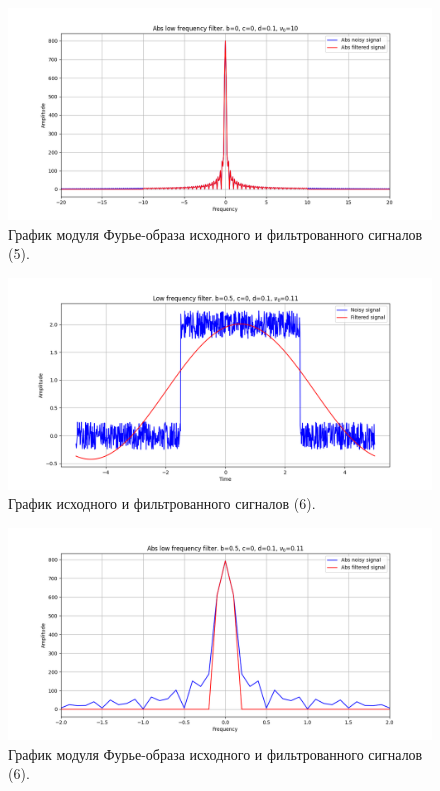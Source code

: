 \documentclass[a4paper, 12pt]{article}
\begin{document}
    \begin{figure}[!htb]
        \centering
        \includegraphics[scale=0.48]{4_abs_u_U_nohigh.png}
        \captionsetup{skip=0pt}
        \caption{График модуля Фурье-образа исходного и фильтрованного сигналов (5).}
        \label{fig:fig10}
    \end{figure}
    \begin{figure}[!htb]
        \centering
        \includegraphics[scale=0.48]{11_u_flt_u_nohigh.png}
        \captionsetup{skip=0pt}
        \caption{График исходного и фильтрованного сигналов (6).}
        \label{fig:fig11}
    \end{figure}
    \begin{figure}[!htb]
        \centering
        \includegraphics[scale=0.48]{11_abs_u_U_nohigh.png}
        \captionsetup{skip=0pt}
        \caption{График модуля Фурье-образа исходного и фильтрованного сигналов (6).}
        \label{fig:fig12}
    \end{figure}
\end{document}
